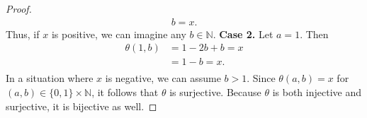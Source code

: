 \documentclass[12pt]{article}
\begin{document}
\begin{description}
\begin{spacing}{2}
\begin{proof}
\begin{align*}
    b = x.
\end{align*}
Thus, if $x$ is positive, we can imagine any $b \in \mathbb{N}$.
\newline
\textbf{Case 2.} Let $a = 1$. Then
\begin{align*}
    \theta(1,b) &= 1 - 2b + b = x \\
    &= 1 - b = x. \\
\end{align*}
In a situation where $x$ is negative, we can assume $b > 1$.
Since $\theta(a,b) = x$ for $(a,b) \in \{0,1\} \times \mathbb{N}$, it follows that $\theta$ is surjective.
\newline
Because $\theta$ is both injective and surjective, it is bijective as well.
\end{proof}
\end{spacing}
\end{description}
%
\newpage
{}
%
\end{document}

